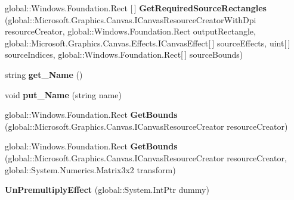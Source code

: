 \begin{DoxyCompactItemize}
global\+::\+Windows.\+Foundation.\+Rect \mbox{[}$\,$\mbox{]} {\bfseries Get\+Required\+Source\+Rectangles} (global\+::\+Microsoft.\+Graphics.\+Canvas.\+I\+Canvas\+Resource\+Creator\+With\+Dpi resource\+Creator, global\+::\+Windows.\+Foundation.\+Rect output\+Rectangle, global\+::\+Microsoft.\+Graphics.\+Canvas.\+Effects.\+I\+Canvas\+Effect\mbox{[}$\,$\mbox{]} source\+Effects, uint\mbox{[}$\,$\mbox{]} source\+Indices, global\+::\+Windows.\+Foundation.\+Rect\mbox{[}$\,$\mbox{]} source\+Bounds)
\item 
\mbox{\label{class_microsoft_1_1_graphics_1_1_canvas_1_1_effects_1_1_un_premultiply_effect_a1701d736dba660f462b011581f055b17}} 
string {\bfseries get\+\_\+\+Name} ()
\item 
\mbox{\label{class_microsoft_1_1_graphics_1_1_canvas_1_1_effects_1_1_un_premultiply_effect_acd1571fa9f397e1baa0a8c32080b1c2d}} 
void {\bfseries put\+\_\+\+Name} (string name)
\item 
\mbox{\label{class_microsoft_1_1_graphics_1_1_canvas_1_1_effects_1_1_un_premultiply_effect_a5100abdc8715c4ba995f6f6a6e0cb593}} 
global\+::\+Windows.\+Foundation.\+Rect {\bfseries Get\+Bounds} (global\+::\+Microsoft.\+Graphics.\+Canvas.\+I\+Canvas\+Resource\+Creator resource\+Creator)
\item 
\mbox{\label{class_microsoft_1_1_graphics_1_1_canvas_1_1_effects_1_1_un_premultiply_effect_a88c2619b79305957a357452b58d66be6}} 
global\+::\+Windows.\+Foundation.\+Rect {\bfseries Get\+Bounds} (global\+::\+Microsoft.\+Graphics.\+Canvas.\+I\+Canvas\+Resource\+Creator resource\+Creator, global\+::\+System.\+Numerics.\+Matrix3x2 transform)
\item 
\mbox{\label{class_microsoft_1_1_graphics_1_1_canvas_1_1_effects_1_1_un_premultiply_effect_afec8af676d2e6c2a8e095f427e8782f9}} 
{\bfseries Un\+Premultiply\+Effect} (global\+::\+System.\+Int\+Ptr dummy)
\item 
\mbox{\label{class_microsoft_1_1_graphics_1_1_canvas_1_1_effects_1_1_un_premultiply_effect_a046dc1273449b99a5005b41f3a9300ee}} 

\end{DoxyCompactItemize}
